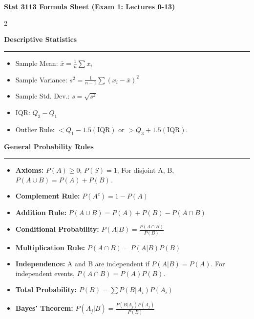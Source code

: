 \documentclass[10pt, letterpaper]{article}
\newcommand{\sectionhead}[1]{%
    \begin{center}%
    \large\bfseries#1%
    \end{center}%
    \vspace{-2mm}%
    \hrule%
    \vspace{2mm}%
}
\begin{document}
\begin{center}
    \huge\bfseries Stat 3113 Formula Sheet (Exam 1: Lectures 0-13)
\end{center}
\vspace{2mm}

\begin{multicols}{2}

\sectionhead{Descriptive Statistics}
\begin{itemize}[leftmargin=*, itemsep=0pt]
    \item Sample Mean: \(\bar{x} = \frac{1}{n}\sum x_i\)
    \item Sample Variance: \(s^2 = \frac{1}{n-1}\sum (x_i - \bar{x})^2\)
    \item Sample Std. Dev.: \(s = \sqrt{s^2}\)
    \item IQR: \(Q_3 - Q_1\)
    \item Outlier Rule: \(< Q_1 - 1.5(\text{IQR})\) or \(> Q_3 + 1.5(\text{IQR})\).
\end{itemize}

\sectionhead{General Probability Rules}
\begin{itemize}[leftmargin=*, itemsep=0pt]
    \item \textbf{Axioms:} \(P(A) \ge 0\); \(P(S)=1\); For disjoint A, B, \(P(A \cup B) = P(A)+P(B)\).
    \item \textbf{Complement Rule:} \(P(A^c) = 1 - P(A)\)
    \item \textbf{Addition Rule:} \(P(A \cup B) = P(A) + P(B) - P(A \cap B)\)
    \item \textbf{Conditional Probability:} \(P(A|B) = \frac{P(A \cap B)}{P(B)}\)
    \item \textbf{Multiplication Rule:} \(P(A \cap B) = P(A|B)P(B)\)
    \item \textbf{Independence:} A and B are independent if \(P(A|B) = P(A)\). For independent events, \(P(A \cap B) = P(A)P(B)\).
    \item \textbf{Total Probability:} \(P(B) = \sum P(B|A_i)P(A_i)\)
    \item \textbf{Bayes' Theorem:} \(P(A_j|B) = \frac{P(B|A_j)P(A_j)}{P(B)}\)
\end{itemize}


\end{multicols}
\end{document}

